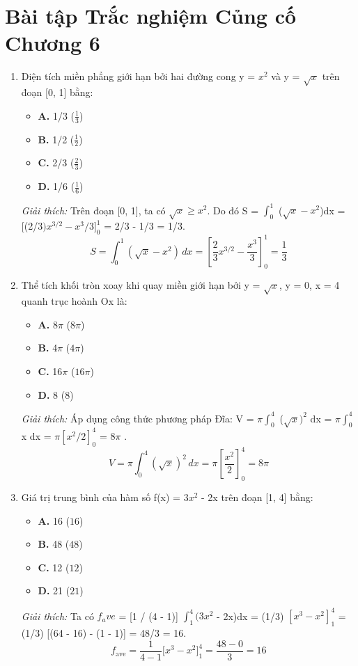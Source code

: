 \documentclass[11pt,a4paper,oneside]{book}
\begin{document}
\section{Bài tập Trắc nghiệm Củng cố Chương 6}
\begin{enumerate}[label=\textbf{Câu \arabic*:}, leftmargin=2.2em, itemsep=8pt]
  \item Diện tích miền phẳng giới hạn bởi hai đường cong y = $x^2$ và y = $\sqrt{x}$ trên đoạn [0, 1] bằng:
  \begin{itemize}[label={}, leftmargin=1em, itemsep=2pt]
    \item \textbf{A.} 1/3 \quad ($\frac{1}{3}$)
    \item \textbf{B.} 1/2 \quad ($\frac{1}{2}$)
    \item \textbf{C.} 2/3 \quad ($\frac{2}{3}$)
    \item \textbf{D.} 1/6 \quad ($\frac{1}{6}$)
  \end{itemize}
  \vspace{2pt}
   \textit{Giải thích:} Trên đoạn [0, 1], ta có $\sqrt{x} \ge x^2$. Do đó S = $\int_0^1$ ($\sqrt{x} - x^2$)dx = [(2/$3)x^{3/2} - x^3 / 3]_0^1$ = 2/3 - 1/3 = 1/3.
  \[ S = \int_0^1 (\sqrt{x} - x^2)\,dx = \left[\frac{2}{3}x^{3/2} - \frac{x^3}{3}\right]_0^1 = \frac{1}{3} \]
  \item Thể tích khối tròn xoay khi quay miền giới hạn bởi y = $\sqrt{x}$, y = 0, x = 4 quanh trục hoành Ox là:
  \begin{itemize}[label={}, leftmargin=1em, itemsep=2pt]
    \item \textbf{A.} 8$\pi$  \quad ($8\pi$)
    \item \textbf{B.} 4$\pi$  \quad ($4\pi$)
    \item \textbf{C.} 16$\pi$  \quad ($16\pi$)
    \item \textbf{D.} 8 \quad ($8$)
  \end{itemize}
  \vspace{2pt}
   \textit{Giải thích:} Áp dụng công thức phương pháp Đĩa: V = $\pi \int_0^4$ ($\sqrt{x} )^2$ dx = $\pi \int_0^4$ x dx = $\pi  [x^2 / 2]_0^4$ = 8$\pi$ .
  \[ V = \pi \int_0^4 (\sqrt{x})^2\,dx = \pi \left[\frac{x^2}{2}\right]_0^4 = 8\pi \]
  \item Giá trị trung bình của hàm số f(x) = $3x^2$ - 2x trên đoạn [1, 4] bằng:
  \begin{itemize}[label={}, leftmargin=1em, itemsep=2pt]
    \item \textbf{A.} 16 \quad ($16$)
    \item \textbf{B.} 48 \quad ($48$)
    \item \textbf{C.} 12 \quad ($12$)
    \item \textbf{D.} 21 \quad ($21$)
  \end{itemize}
  \vspace{2pt}
   \textit{Giải thích:} Ta có $f_ave$ = [1 / (4 - 1)] $\int_1^4 (3x^2$ - 2x)dx = (1/3) $[x^3 - x^2 ]_1^4$ = (1/3) [(64 - 16) - (1 - 1)] = 48/3 = 16.
  \[ f_{\text{ave}} = \frac{1}{4-1} \Big[x^3 - x^2\Big]_1^4 = \frac{48 - 0}{3} = 16 \]
\end{enumerate}
\end{document}
